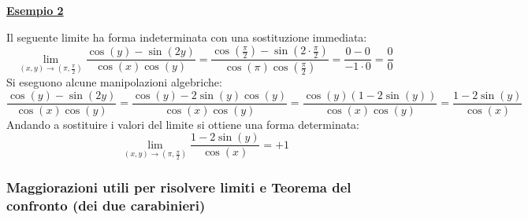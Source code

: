 \documentclass[a4paper]{article}
\newcommand{\example}[1]{\textcolor{Green4}{\textbf{#1}}}
\begin{document}
	\begin{flushleft}
		\example{\underline{Esempio 2}}
	\end{flushleft}
	Il seguente limite ha forma indeterminata con una sostituzione immediata:
	\begin{equation*}
		\displaystyle\lim_{\left(x,y\right) \rightarrow \left(\pi, \frac{\pi}{2}\right)} \dfrac{\cos\left(y\right) - \sin\left(2y\right)}{\cos\left(x\right)\cos\left(y\right)} = \dfrac{\cos\left(\frac{\pi}{2}\right) - \sin\left(2 \cdot \frac{\pi}{2}\right)}{\cos\left(\pi\right)\cos\left(\frac{\pi}{2}\right)} = \dfrac{0 - 0}{-1\cdot 0} = \dfrac{0}{0}
	\end{equation*}
	Si eseguono alcune manipolazioni algebriche:
	\begin{equation*}
		\dfrac{\cos\left(y\right) - \sin\left(2y\right)}{\cos\left(x\right)\cos\left(y\right)} = 
		\dfrac{\cos\left(y\right) - 2 \sin\left(y\right) \cos\left(y\right)}{\cos\left(x\right)\cos\left(y\right)} =
		\dfrac{\cos\left(y\right)\left(1-2\sin\left(y\right)\right)}{\cos\left(x\right)\cos\left(y\right)} =
		\dfrac{1 - 2\sin\left(y\right)}{\cos\left(x\right)}
	\end{equation*}
	Andando a sostituire i valori del limite si ottiene una forma determinata:
	\begin{equation*}
		\displaystyle\lim_{\left(x,y\right) \rightarrow \left(\pi, \frac{\pi}{2}\right)} \dfrac{1 - 2\sin\left(y\right)}{\cos\left(x\right)} = +1
	\end{equation*}\newpage

	\subsubsection{Maggiorazioni utili per risolvere limiti e Teorema del confronto (dei due carabinieri)}\label{subsubsection: maggiorazioni utili per risolvere limiti e Teorema del confronto (dei due carabinieri)}
\end{document}
